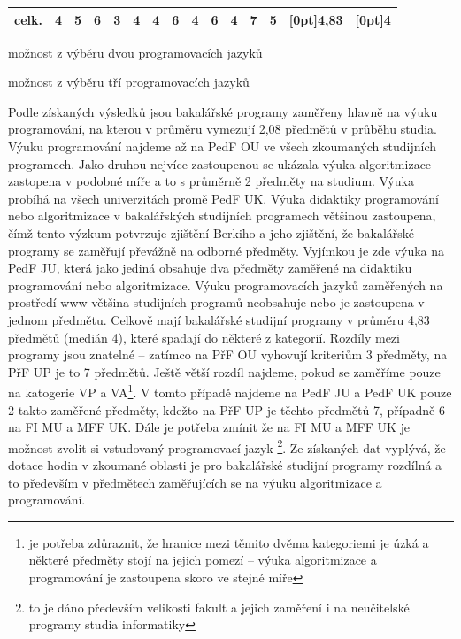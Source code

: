 \documentclass[FP,DP]{tulthesis}
\begin{document}
{{{{{{{\begin{table}[htbp]
\begin{threeparttable}
\begin{tabular}{C{1cm}C{0.7cm}C{0.7cm}C{0.7cm}C{0.7cm}C{0.7cm}C{0.8cm}C{0.7cm}C{0.7cm}C{0.7cm}C{0.7cm}C{0.7cm}C{0.7cm}|>{[0pt]}C{0.7cm}>{[0pt]}C{0.7cm}}
celk.&4       &5   &6   &3   &4       &4   &6   & 4       &6      &4       & 7    &5 &4,83&4       \\  \bottomrule
\end{tabular}
\begin{tablenotes}\footnotesize
\item[1] možnost z výběru dvou programovacích jazyků
\item[2] možnost z výběru tří programovacích jazyků
\end{tablenotes}
\end{threeparttable}
\end{table}
Podle získaných výsledků jsou bakalářské programy zaměřeny hlavně na výuku programování, na kterou v průměru vymezují 2,08 předmětů v průběhu studia. Výuku programování najdeme až na PedF OU ve všech zkoumaných studijních programech. Jako druhou nejvíce zastoupenou se ukázala výuka algoritmizace zastopena v podobné míře a to s průměrně 2 předměty na studium. Výuka probíhá na všech univerzitách promě PedF UK. Výuka didaktiky programování nebo algoritmizace v bakalářských studijních programech většinou zastoupena, čímž tento výzkum potvrzuje zjištění Berkiho a jeho zjištění, že bakalářské programy se zaměřují převážně na odborné předměty. Vyjímkou je zde výuka na PedF JU, která jako jediná obsahuje dva předměty zaměřené na didaktiku programování nebo algoritmizace. Výuku programovacích jazyků zaměřených na prostředí www většina studijních programů neobsahuje nebo je zastoupena v jednom předmětu. 
Celkově mají bakalářské studijní programy v průměru 4,83 předmětů (medián 4), které spadají do některé z kategorií. Rozdíly mezi programy jsou znatelné --  zatímco na PřF OU vyhovují kriteriům 3 předměty, na PřF UP je to 7 předmětů. Ještě větší rozdíl najdeme, pokud se zaměříme pouze na katogerie VP a VA\footnote{je potřeba zdůraznit, že hranice mezi těmito dvěma kategoriemi je úzká a některé předměty stojí na jejich pomezí -- výuka algoritmizace a programování je zastoupena skoro ve stejné míře}. V tomto případě najdeme  na PedF JU a PedF UK  pouze 2 takto zaměřené předměty, kdežto na PřF UP je těchto předmětů 7, případně 6 na FI MU a MFF UK. Dále je potřeba zmínit že na FI MU a MFF UK je možnost zvolit si vstudovaný programovací jazyk \footnote{to je dáno především velikosti fakult a jejich zaměření i na neučitelské programy studia informatiky}.  Ze získaných dat vyplývá, že dotace hodin  v zkoumané oblasti je pro bakalářské studijní programy rozdílná a to především v předmětech zaměřujících se na výuku algoritmizace a programování.



}}}}}}}
\end{document}
